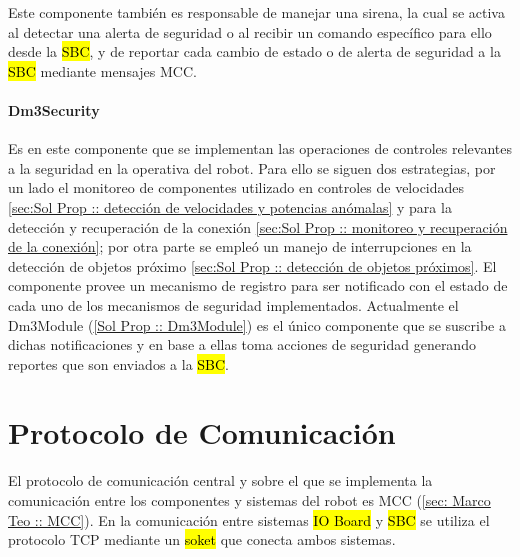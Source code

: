 \documentclass[withindex,glossary]{cam-thesis}
\begin{document}
Este componente también es responsable de manejar una sirena, la cual se activa al detectar una alerta de seguridad o al recibir un comando específico para ello desde la \hl{SBC}, y de reportar cada cambio de estado o de alerta de seguridad a la \hl{SBC} mediante mensajes MCC.


\paragraph{Dm3Security} \label{sec:Sol Prop :: Dm3Security}
Es en este componente que se implementan las operaciones de controles relevantes a la seguridad en la operativa del robot. Para ello se siguen dos estrategias, por un lado el monitoreo de componentes utilizado en controles de velocidades \ref{sec:Sol Prop :: detección de velocidades y potencias anómalas} y para la detección y recuperación de la conexión \ref{sec:Sol Prop :: monitoreo y recuperación de la conexión}; por otra parte se empleó un manejo de interrupciones en la detección de objetos próximo \ref{sec:Sol Prop :: detección de objetos próximos}.
El componente provee un mecanismo de registro para ser notificado con el estado de cada uno de los mecanismos de seguridad implementados. Actualmente el Dm3Module (\ref{Sol Prop :: Dm3Module}) es el único componente que se suscribe a dichas notificaciones y en base a ellas toma acciones de seguridad generando reportes que son enviados a la \hl{SBC}.

\section{Protocolo de Comunicación}
El protocolo de comunicación central y sobre el que se implementa la comunicación entre los componentes y sistemas del robot es MCC (\ref{sec: Marco Teo :: MCC}). En la comunicación entre sistemas \hl{IO Board} y \hl{SBC} se utiliza el protocolo TCP mediante un \hl{soket} que conecta ambos sistemas.
\end{document}
